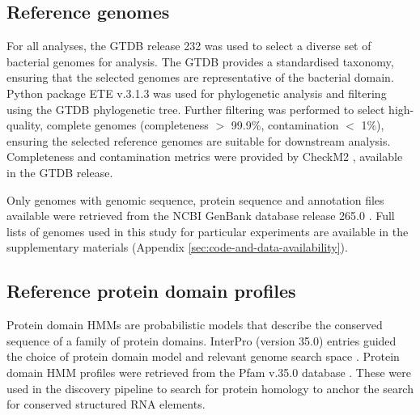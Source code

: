 



\subsection{Reference genomes}
\label{subsec:reference-genomes}

For all analyses, the \ac{GTDB} release 232 \citep{Parks2022} was used to select a diverse set of bacterial genomes for analysis. 
The GTDB provides a standardised taxonomy, ensuring that the selected genomes are representative of the bacterial domain. 
Python package \ac{ETE} v.3.1.3 \citep{huertacepas2016} was used for phylogenetic analysis and filtering using the \ac{GTDB} phylogenetic tree.
Further filtering was performed to select high-quality, complete genomes (completeness $>$ 99.9\%, contamination $<$ 1\%), ensuring the selected reference genomes are suitable for downstream analysis.
Completeness and contamination metrics were provided by CheckM2 \citep{Chklovski2023}, available in the \ac{GTDB} release.

Only genomes with genomic sequence, protein sequence and annotation files available were retrieved from the \ac{NCBI} GenBank database release 265.0 \citep{OLeary2024}.
Full lists of genomes used in this study for particular experiments are available in the supplementary materials (Appendix \ref{sec:code-and-data-availability}).

\subsection{Reference protein domain profiles}
\label{subsec:protein-hmm-retrieval}

Protein domain \ac{HMM}s are probabilistic models that describe the conserved sequence of a family of protein domains.
InterPro (version 35.0) entries guided the choice of protein domain model and relevant genome search space \citep{Blum2025}.
Protein domain \ac{HMM} profiles were retrieved from the Pfam v.35.0 database \citep{Paysan-Fafosse2025}.
These were used in the discovery pipeline to search for protein homology to anchor the search for conserved structured RNA elements.

